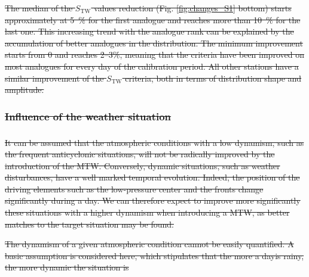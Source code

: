 \documentclass[hess, manuscript]{copernicus}
\providecommand{\DIFadd}[1]{{\protect\color{blue}\uwave{#1}}} %
\providecommand{\DIFdel}[1]{{\protect\color{red}\sout{#1}}}                      %
\providecommand{\DIFaddbegin}{} %
\providecommand{\DIFaddend}{} %
\providecommand{\DIFdelbegin}{} %
\providecommand{\DIFdelend}{} %
\begin{document}
	
	\DIFdelbegin \DIFdel{The median of the $S_{\text{TW}}$ values reduction (Fig. \ref{fig:changes_S1} bottom) starts approximately at 5~\% for the first analogue and reaches more than 10~\% for the last one. This increasing trend with the analogue rank can be explained by the accumulation of better analogues in the distribution. The minimum improvement starts from 0 and reaches 2--3\%, meaning that the criteria have been improved on most analogues for every day of the calibration period. All other stations have a similar improvement of the $S_{\text{TW}}$ criteria, both in terms of distribution shape and amplitude.
}%

\subsubsection{\DIFdel{Influence of the weather situation}}
\addtocounter{subsubsection}{-1}%
\DIFdelend \DIFaddbegin \subsubsection{\DIFadd{Changes per precipitation class}}
	\DIFaddend \label{sec:influence_precip}
	\DIFdelbegin %

\DIFdel{It can be assumed that the atmospheric conditions with a low dynamism, such as the frequent anticyclonic situations, will not be radically improved by the introduction of the MTW. Conversely, dynamic situations, such as weather disturbances, have a well marked temporal evolution. Indeed, the position of the driving elements such as the low-pressure center and the fronts change significantly during a day. We can therefore expect to improve more significantly these situations with a higher dynamism when introducing a MTW, as better matches to the target situation may be found.
}%

\DIFdel{The dynamism of a given atmospheric condition cannot be easily quantified. A basic assumption is considered here, which stipulates that the more a dayis rainy, the more dynamic the situation is}\DIFdelend \DIFaddbegin 
\end{document}
